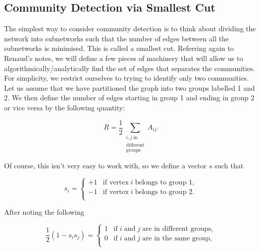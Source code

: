 


\subsection{Community Detection via Smallest Cut}
The simplest way to consider community detection is to think about dividing the network into subnetworks such that the number of edges between all the subnetworks is minimised. This is called a smallest cut. Referring again to Renaud's notes, we will define a few pieces of machinery that will allow us to algorithmically/analytically find the set of edges that separates the communities.\cite[26-27]{oxford:renaud_notes} For simplicity, we restrict ourselves to trying to identify only two communities. Let us assume that we have partitioned the graph into two groups labelled 1 and 2. We then define the number of edges starting in group 1 and ending in group 2 or vice versa by the following quantity:

$$ R = \frac{1}{2} \sum_{\substack{i, j \; \text{in} \\ \text{different} \\ \text{groups}}} A_{ij}. $$

Of course, this isn't very easy to work with, so we define a vector $s$ such that

$$ s_i = 
\begin{cases}
    +1 & \text{if vertex} \; i \; \text{belongs to group 1}, \\
    -1 & \text{if vertex} \; i \; \text{belongs to group 2}. \\
\end{cases}
$$

After noting the following

$$ \frac{1}{2}(1 - s_i s_j) = 
\begin{cases}
    1 & \text{if} \; i \; \text{and} \; j \; \text{are in different groups}, \\
    0 & \text{if} \; i \; \text{and} \; j \; \text{are in the same group}, \\
\end{cases}
$$

